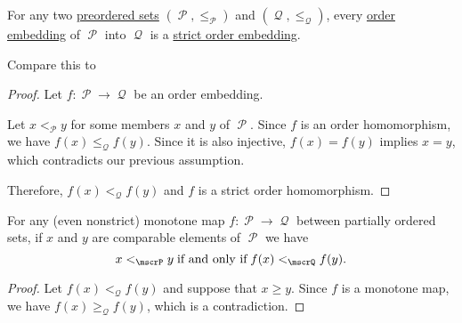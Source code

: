 \begin{proposition}\label{thm:order_embedding_is_strict}
  For any two \hyperref[def:preordered_set]{preordered sets} \( (\mscrP, \leq_\mscrP) \) and \( (\mscrQ, \leq_\mscrQ) \), every \hyperref[def:partially_ordered_set/homomorphism]{order embedding} of \( \mscrP \) into \( \mscrQ \) is a \hyperref[def:partially_ordered_set/homomorphism]{strict order embedding}.

  Compare this to 
\end{proposition}
\begin{proof}
  Let \( f: \mscrP \to \mscrQ \) be an order embedding.

  Let \( x <_\mscrP y \) for some members \( x \) and \( y \) of \( \mscrP \). Since \( f \) is an order homomorphism, we have \( f(x) \leq_\mscrQ f(y) \). Since it is also injective, \( f(x) = f(y) \) implies \( x = y \), which contradicts our previous assumption.

  Therefore, \( f(x) <_\mscrQ f(y) \) and \( f \) is a strict order homomorphism.
\end{proof}

\begin{proposition}\label{thm:monotone_map_converse}
  For any (even nonstrict) monotone map \( f: \mscrP \to \mscrQ \) between partially ordered sets, if \( x \) and \( y \) are comparable elements of \( \mscrP \) we have
  \begin{equation}\label{eq:thm:monotone_map_converse}
    x <_\mscrP y \T{if and only if} f(x) <_\mscrQ f(y).
  \end{equation}
\end{proposition}
\begin{proof}
  Let \( f(x) <_\mscrQ f(y) \) and suppose that \( x \geq y \). Since \( f \) is a monotone map, we have \( f(x) \geq_\mscrQ f(y) \), which is a contradiction.
\end{proof}

